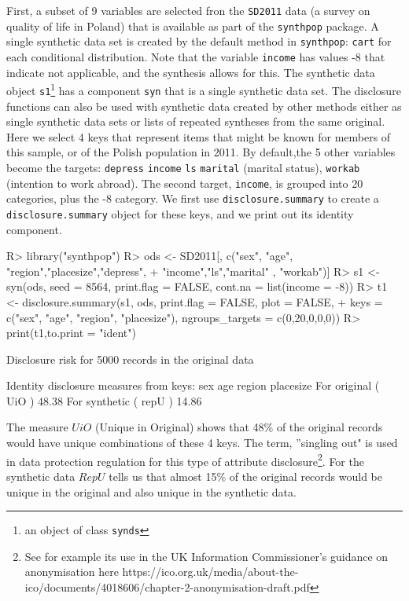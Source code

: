 \documentclass[12pt]{article}
\renewcommand{\baselinestretch}{1.5} %
\begin{document}
First, a subset of 9 variables are selected fron the \texttt{SD2011} data (a survey on quality of life in Poland) that is available as part of the \texttt{synthpop} package. A single synthetic data set is created by the default method in \texttt{synthpop}: \texttt{cart} for each conditional distribution. Note that the variable \texttt{income} has values -8 that indicate not applicable, and the synthesis allows for this. The synthetic data object \texttt{s1}\footnote{an object of class \texttt{synds}} has a component \texttt{syn} that is a single synthetic data set. The disclosure functions can also be used with synthetic data created by other methods either as single synthetic data sets or lists of repeated syntheses from the same original. Here we select 4 keys that represent items that might be known
for members of this sample, or of the Polish population in 2011. By default,the 5 other variables become the targets: \texttt{depress} \texttt{income} \texttt{ls} \texttt{marital} (marital status), \texttt{workab} (intention to work abroad). The second target, \texttt{income}, is grouped into 20 categories, plus the -8 category. 
We first use \texttt{disclosure.summary} to create a \texttt{disclosure.summary} object for these keys, and we print out its identity component.
\renewcommand{\baselinestretch}{1.0}
\begin{Schunk}
\begin{Sinput}
R> library("synthpop")
R> ods <- SD2011[, c("sex", "age", "region","placesize","depress",
+    "income","ls","marital" , "workab")]
R> s1 <- syn(ods, seed = 8564, print.flag = FALSE, cont.na = list(income = -8))
R> t1 <- disclosure.summary(s1, ods, print.flag = FALSE, plot = FALSE, 
+  keys = c("sex", "age", "region", "placesize"),   ngroups_targets = c(0,20,0,0,0))
R> print(t1,to.print = "ident")
\end{Sinput}
\begin{Soutput}
Disclosure risk for 5000 records in the original data

Identity disclosure measures
from keys: sex age region placesize 
For original  ( UiO )  48.38 %
For synthetic ( repU ) 14.86 %
\end{Soutput}
\end{Schunk}
\renewcommand{\baselinestretch}{1.5}
The measure $UiO$ (Unique in Original) shows that 48\% of the original records would have unique combinations of these 4 keys. The term, ''singling out" is used in data protection regulation for this type of attribute disclosure\footnote{See for example its use in the UK Information Commissioner's guidance on anonymisation here https://ico.org.uk/media/about-the-ico/documents/4018606/chapter-2-anonymisation-draft.pdf}. For the synthetic data $RepU$ tells us that almost 15\% of the original records would be unique in the original and also unique in the synthetic data.
\end{document}
